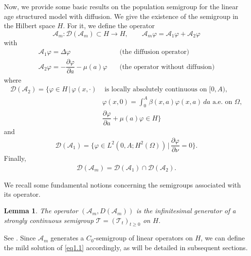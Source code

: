\documentclass[10pt, a4]{amsart}
\makeatletter
\theoremstyle{plain}
\newtheorem{lemma}{Lemma}[section]
\theoremstyle{definition}
\theoremstyle{remark}
\renewenvironment{proof}[1][\proofname]{\par
  \pushQED{\qed}%
  \normalfont \topsep6\p@\@plus6\p@\relax
  \trivlist
  \item[\hskip\labelsep
        \itshape
    #1\ \ref{#1}.]\ignorespaces
}{%
  \popQED\endtrivlist\@endpefalse
}
\numberwithin{equation}{section}
\makeatother
\begin{document}

Now, we provide some basic results on the population semigroup for the linear age structured model with diffusion. We give the existence of the semigroup in the Hilbert space $H.$ For it, we define the operator 
\begin{equation*}
\mathcal{A}_m: \mathcal{D}(\mathcal{A}_m)\subset H \longrightarrow H, \qquad \mathcal{A}_m \varphi = \mathcal{A}_1 \varphi + \mathcal{A}_2 \varphi
\end{equation*}
with
\begin{align*}
\mathcal{A}_1 \varphi = \Delta \varphi \quad &\text{(the diffusion operator)} \\
\mathcal{A}_2 \varphi = -\dfrac{\partial \varphi}{\partial a} - \mu(a) \varphi  \quad &\text{(the operator without diffusion)}
\end{align*}
where
\begin{align*}
\mathcal{D}(\mathcal{A}_2) = \Big\{ \varphi \in H \, \big| \, \varphi(x, \cdot) &\text{ is locally absolutely continuous on } [0, A), \\
&\varphi(x, 0) = \int_{0}^{A} \beta(x, a) \varphi(x, a) \, da \text{ a.e. on } \Omega, \\
&\dfrac{\partial \varphi}{\partial a} + \mu(a) \varphi \in H \Big\}
\end{align*}
and
\begin{align*}
\mathcal{D}(\mathcal{A}_1) = \Big\{ \varphi \in L^2(0, A; H^2(\Omega)) \, \big| \, \dfrac{\partial \varphi}{\partial \nu} = 0 \Big\}.
\end{align*}
Finally, \begin{align*}
    \mathcal{D}(\mathcal{A}_m)=\mathcal{D}(\mathcal{A}_1)\cap\mathcal{D}(\mathcal{A}_2).
\end{align*}

We recall some fundamental notions concerning the semigroups associated with its operator. %

\begin{lemma}\label{le1.1}
The operator \((\mathcal{A}_m, D(\mathcal{A}_m))\) is the infinitesimal generator of a strongly continuous semigroup \(\mathcal{T} = (\mathcal{T}_t)_{t\geq 0}\) on \(H\).
\end{lemma}
\begin{proof}
    See \cite{ref72}.
\end{proof}
Since \(\mathcal{A}_m\) generates a \(C_0\)-semigroup of linear operators on \(H\), we can define the mild solution of \eqref{eq1.1} accordingly, as will be detailed in subsequent sections.
\end{document}
